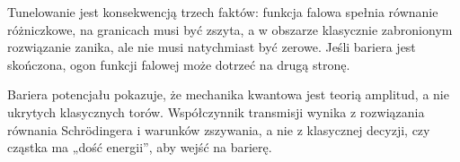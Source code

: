 Tunelowanie jest konsekwencją trzech faktów: funkcja falowa spełnia równanie różniczkowe, na granicach musi być zszyta, a w obszarze klasycznie zabronionym rozwiązanie zanika, ale nie musi natychmiast być zerowe. Jeśli bariera jest skończona, ogon funkcji falowej może dotrzeć na drugą stronę.

\begin{summarybox}
Bariera potencjału pokazuje, że mechanika kwantowa jest teorią amplitud, a nie ukrytych klasycznych torów. Współczynnik transmisji wynika z rozwiązania równania Schrödingera i warunków zszywania, a nie z klasycznej decyzji, czy cząstka ma „dość energii”, aby wejść na barierę.
\end{summarybox}
